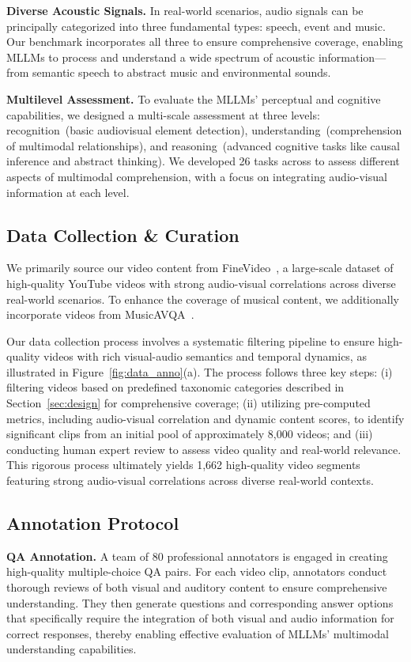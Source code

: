 \textbf{Diverse Acoustic Signals.} 
In real-world scenarios, audio signals can be principally categorized into three fundamental types: speech, event and music. Our benchmark incorporates all three to ensure comprehensive coverage, enabling MLLMs to process and understand a wide spectrum of acoustic information—from semantic speech to abstract music and environmental sounds.



\textbf{Multilevel Assessment.} 
To evaluate the MLLMs’ perceptual and cognitive capabilities, we designed a multi-scale assessment at three levels: recognition~(basic audiovisual element detection), understanding~(comprehension of multimodal relationships), and reasoning~(advanced cognitive tasks like causal inference and abstract thinking). We developed 26 tasks across to assess different aspects of multimodal comprehension, with a focus on integrating audio-visual information at each level. 




\subsection{Data Collection \& Curation }

We primarily source our video content from FineVideo~\cite{Farr2024FineVideo}, a large-scale dataset of high-quality YouTube videos with strong audio-visual correlations across diverse real-world scenarios. To enhance the coverage of musical content, we additionally incorporate videos from MusicAVQA~\cite{li2022learning}.


Our data collection process involves a systematic filtering pipeline to ensure high-quality videos with rich visual-audio semantics and temporal dynamics, as illustrated in Figure~\ref{fig:data_anno}(a). The process follows three key steps: (i) filtering videos based on predefined taxonomic categories described in Section~\ref{sec:design} for comprehensive coverage; (ii) utilizing pre-computed metrics, including audio-visual correlation and dynamic content scores, to identify significant clips from an initial pool of approximately 8,000 videos; and (iii) conducting human expert review to assess video quality and real-world relevance. This rigorous process ultimately yields 1,662 high-quality video segments featuring strong audio-visual correlations across diverse real-world contexts.






\subsection{Annotation Protocol} 
\textbf{QA Annotation.} 
A team of 80 professional annotators is engaged in creating high-quality multiple-choice QA pairs. For each video clip, annotators conduct thorough reviews of both visual and auditory content to ensure comprehensive understanding. They then generate questions and corresponding answer options that specifically require the integration of both visual and audio information for correct responses, thereby enabling effective evaluation of MLLMs' multimodal understanding capabilities.


